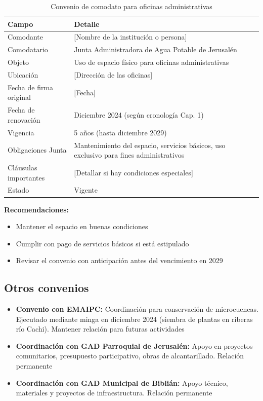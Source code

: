 \begin{table}[H]
\centering
\caption{Convenio de comodato para oficinas administrativas}
\label{tab:comodato-oficinas}
\begin{tabularx}{\textwidth}{@{}lX@{}}
\toprule
\textbf{Campo} & \textbf{Detalle} \\
\midrule
Comodante & [Nombre de la institución o persona] \\
Comodatario & Junta Administradora de Agua Potable de Jerusalén \\
Objeto & Uso de espacio físico para oficinas administrativas \\
Ubicación & [Dirección de las oficinas] \\
Fecha de firma original & [Fecha] \\
Fecha de renovación & Diciembre 2024 (según cronología Cap. 1) \\
Vigencia & 5 años (hasta diciembre 2029) \\
Obligaciones Junta & Mantenimiento del espacio, servicios básicos, uso exclusivo para fines administrativos \\
Cláusulas importantes & [Detallar si hay condiciones especiales] \\
Estado & Vigente \\
\bottomrule
\end{tabularx}
\end{table}

\textbf{Recomendaciones:}
\begin{itemize}
  \item Mantener el espacio en buenas condiciones
  \item Cumplir con pago de servicios básicos si está estipulado
  \item Revisar el convenio con anticipación antes del vencimiento en 2029
\end{itemize}

\subsection*{Otros convenios}

\begin{itemize}
  \item \textbf{Convenio con EMAIPC:} Coordinación para conservación de microcuencas. Ejecutado mediante minga en diciembre 2024 (siembra de plantas en riberas río Cachi). Mantener relación para futuras actividades
  \item \textbf{Coordinación con GAD Parroquial de Jerusalén:} Apoyo en proyectos comunitarios, presupuesto participativo, obras de alcantarillado. Relación permanente
  \item \textbf{Coordinación con GAD Municipal de Biblián:} Apoyo técnico, materiales y proyectos de infraestructura. Relación permanente
\end{itemize}

